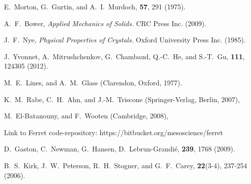 \documentclass[22pt]{article} %
\begin{document}
\begin{thebibliography}{1}

E.~Morton, G.~Gurtin, and A.~I.~Murdoch, 
 \textbf{57}, 291 (1975).

A.~F.~Bower,
\newblock \emph{Applied Mechanics of Solids.} CRC Press Inc. (2009).

J.~F.~Nye,
\newblock \emph{Physical Properties of Crystals.} Oxford University Press Inc. (1985).

J.~Yvonnet, A.~Mitrushchenkov, G.~Chambaud, Q.-C.~He, and S.-T.~Gu, 
 \textbf{111}, 124305 (2012).

M.~E.~Lines, and A.~M.~Glass 
 (Clarendon, Oxford, 1977).

K.~M.~Rabe, C.~H.~Ahn, and J.-M.~Triscone
 (Springer-Verlag, Berlin, 2007),

M.~El-Batanouny, and F.~Wooten
 (Cambridge, 2008),

Link to Ferret code-repository: https://bitbucket.org/mesoscience/ferret

D.~Gaston, C.~Newman, G.~Hansen, D.~Lebrun-Grandi{\'{e}},
 \textbf{239}, 1768 (2009).

B.~S.~Kirk, J.~W.~Peterson, R.~H.~Stogner, and G.~F.~Carey,
 \textbf{22}(3-4), 237-254 (2006).


\end{thebibliography}
\end{document}
